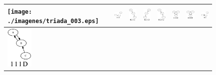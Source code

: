\begin{figure}[!htb]
  \begin{center}
      \begin{tabular}{m{1.3cm}|m{1.3cm}|m{1.3cm}|m{1.3cm}|m{1.3cm}|m{1.3cm}|m{1.3cm}|m{1.3cm}}
        \texttt{[image: ./imagenes/triada\_003.eps]} & 
        \includegraphics[width=1.3cm]{./imagenes/triada_012.eps} & 
        \includegraphics[width=1.3cm]{./imagenes/triada_021C.eps} & 
        \includegraphics[width=1.3cm]{./imagenes/triada_021D.eps} & 
        \includegraphics[width=1.3cm]{./imagenes/triada_021U.eps} & 
        \includegraphics[width=1.3cm]{./imagenes/triada_030C.eps} & 
        \includegraphics[width=1.3cm]{./imagenes/triada_030T.eps} & 
        \includegraphics[width=1.3cm]{./imagenes/triada_102.eps}\\ \hline
        \includegraphics[width=1.3cm]{./imagenes/triada_111D.eps} & 

\end{tabular}
\end{center}
\end{figure}
